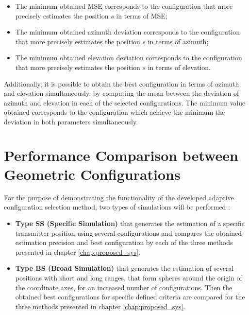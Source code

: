 \begin{itemize}
	
	\item  The minimum obtained MSE corresponds to the configuration that more precisely estimates the position $s$ in terms of MSE;
	
	\item The minimum obtained azimuth deviation corresponds to the configuration that more precisely estimates the position $s$ in terms of azimuth;
	
	\item The minimum obtained elevation deviation corresponds to the configuration that more precisely estimates the position $s$ in terms of elevation.
	
\end{itemize}

Additionally, it is possible to obtain the best configuration in terms of azimuth and elevation simultaneously, by computing the mean between the deviation of azimuth and elevation in each of the selected configurations. The minimum value obtained corresponds to the configuration which achieve the minimum the deviation in both parameters simultaneously.

\section{Performance Comparison between Geometric Configurations } \label{sec:analysis_config_performance}
%
For the purpose of demonstrating the functionality of the developed adaptive configuration selection method, two types of simulations will be performed :

\begin{itemize}
	\item \textbf{Type SS (Specific Simulation)} that generates the estimation of a specific transmitter position using several configurations and compares the obtained estimation precision and best configuration by each of the three methods presented in chapter \ref{chap:proposed_sys}.
	
	\item \textbf{Type BS (Broad Simulation)} that generates the estimation of several positions with short and long ranges, that form spheres around the origin of the coordinate axes, for an increased number of configurations. Then the obtained best configurations for specific defined criteria are compared for the three methods presented in chapter \ref{chap:proposed_sys}.
	
\end{itemize}

